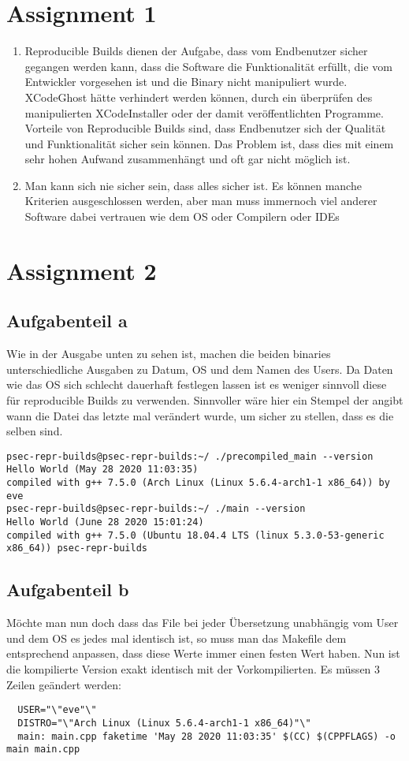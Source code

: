 \documentclass[a4paper,12pt,
headsepline,           %
twoside,               %
pointlessnumbers,      %
bibtotoc,              %
BCOR15mm               %
]{scrbook}
\begin{document}
\section*{Assignment 1}
\begin{enumerate}
    \item Reproducible Builds dienen der Aufgabe, dass vom Endbenutzer sicher gegangen werden kann, dass die Software die Funktionalität erfüllt, die vom Entwickler vorgesehen ist und die Binary nicht manipuliert wurde. XCodeGhost hätte verhindert werden können, durch ein überprüfen des manipulierten XCodeInstaller oder der damit veröffentlichten Programme. Vorteile von Reproducible Builds sind, dass Endbenutzer sich der Qualität und Funktionalität sicher sein können. Das Problem ist, dass dies mit einem sehr hohen Aufwand zusammenhängt und oft gar nicht möglich ist.
    \item Man kann sich nie sicher sein, dass alles sicher ist. Es können manche Kriterien ausgeschlossen werden, aber man muss immernoch viel anderer Software dabei vertrauen wie dem OS oder Compilern oder IDEs
\end{enumerate}

\section*{Assignment 2}
\subsection*{Aufgabenteil a}
Wie in der Ausgabe unten zu sehen ist, machen die beiden binaries unterschiedliche Ausgaben zu Datum, OS und dem Namen des Users. Da Daten wie das OS sich schlecht dauerhaft festlegen lassen ist es weniger sinnvoll diese für reproducible Builds zu verwenden.
Sinnvoller wäre hier ein Stempel der angibt wann die Datei das letzte mal verändert wurde, um sicher zu stellen, dass es die selben sind.

\begin{lstlisting}
psec-repr-builds@psec-repr-builds:~/ ./precompiled_main --version
Hello World (May 28 2020 11:03:35)
compiled with g++ 7.5.0 (Arch Linux (Linux 5.6.4-arch1-1 x86_64)) by eve
psec-repr-builds@psec-repr-builds:~/ ./main --version
Hello World (June 28 2020 15:01:24)
compiled with g++ 7.5.0 (Ubuntu 18.04.4 LTS (linux 5.3.0-53-generic x86_64)) psec-repr-builds
\end{lstlisting}

\subsection*{Aufgabenteil b}
Möchte man nun doch dass das File bei jeder Übersetzung unabhängig vom User und dem OS es jedes mal identisch ist, so muss man das Makefile
dem entsprechend anpassen, dass diese Werte immer einen festen Wert haben. Nun ist die kompilierte Version exakt identisch mit der Vorkompilierten.
Es müssen 3 Zeilen geändert werden:
\begin{lstlisting}
  USER="\"eve"\"
  DISTRO="\"Arch Linux (Linux 5.6.4-arch1-1 x86_64)"\"
  main: main.cpp faketime 'May 28 2020 11:03:35' $(CC) $(CPPFLAGS) -o main main.cpp
\end{lstlisting}
\end{document}
